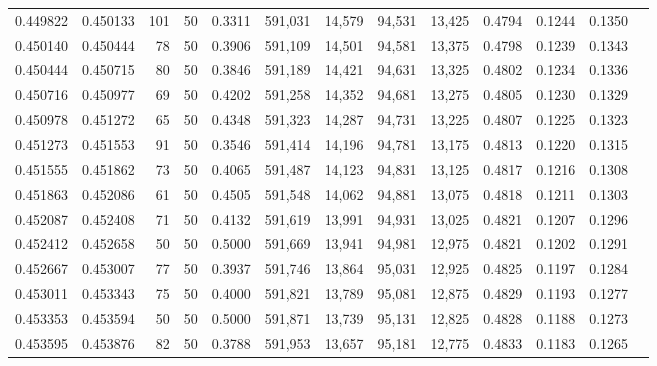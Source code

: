 \begin{tabular}{rrrrrrrrrrrrr}
0.449822 & 0.450133 &   101 &  50 &                                     0.3311 & 591,031 &  14,579 &  94,531 &  13,425 & 0.4794 & 0.1244 & 0.1350 \\
0.450140 & 0.450444 &    78 &  50 &                                     0.3906 & 591,109 &  14,501 &  94,581 &  13,375 & 0.4798 & 0.1239 & 0.1343 \\
0.450444 & 0.450715 &    80 &  50 &                                     0.3846 & 591,189 &  14,421 &  94,631 &  13,325 & 0.4802 & 0.1234 & 0.1336 \\
0.450716 & 0.450977 &    69 &  50 &                                     0.4202 & 591,258 &  14,352 &  94,681 &  13,275 & 0.4805 & 0.1230 & 0.1329 \\
0.450978 & 0.451272 &    65 &  50 &                                     0.4348 & 591,323 &  14,287 &  94,731 &  13,225 & 0.4807 & 0.1225 & 0.1323 \\
0.451273 & 0.451553 &    91 &  50 &                                     0.3546 & 591,414 &  14,196 &  94,781 &  13,175 & 0.4813 & 0.1220 & 0.1315 \\
0.451555 & 0.451862 &    73 &  50 &                                     0.4065 & 591,487 &  14,123 &  94,831 &  13,125 & 0.4817 & 0.1216 & 0.1308 \\
0.451863 & 0.452086 &    61 &  50 &                                     0.4505 & 591,548 &  14,062 &  94,881 &  13,075 & 0.4818 & 0.1211 & 0.1303 \\
0.452087 & 0.452408 &    71 &  50 &                                     0.4132 & 591,619 &  13,991 &  94,931 &  13,025 & 0.4821 & 0.1207 & 0.1296 \\
0.452412 & 0.452658 &    50 &  50 &                                     0.5000 & 591,669 &  13,941 &  94,981 &  12,975 & 0.4821 & 0.1202 & 0.1291 \\
0.452667 & 0.453007 &    77 &  50 &                                     0.3937 & 591,746 &  13,864 &  95,031 &  12,925 & 0.4825 & 0.1197 & 0.1284 \\
0.453011 & 0.453343 &    75 &  50 &                                     0.4000 & 591,821 &  13,789 &  95,081 &  12,875 & 0.4829 & 0.1193 & 0.1277 \\
0.453353 & 0.453594 &    50 &  50 &                                     0.5000 & 591,871 &  13,739 &  95,131 &  12,825 & 0.4828 & 0.1188 & 0.1273 \\
0.453595 & 0.453876 &    82 &  50 &                                     0.3788 & 591,953 &  13,657 &  95,181 &  12,775 & 0.4833 & 0.1183 & 0.1265 \\

\end{tabular}
